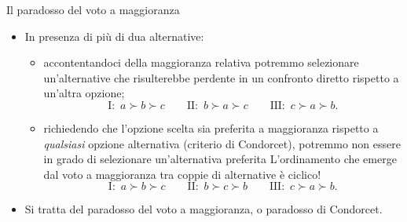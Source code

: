 \documentclass[aspectratio=64,12pt]{beamer}
\begin{document}
\begin{frame}{Il paradosso del voto a maggioranza}
\begin{itemize}
\item In presenza di più di dua alternative:
\begin{itemize}
\item accontentandoci della \alert{maggioranza relativa} potremmo selezionare
un'alternative che risulterebbe perdente in un confronto diretto rispetto
a un'altra opzione;
\begin{equation*}
\text{I:}\enspace a \succ b \succ c \qquad 
\text{II:}\enspace b \succ a \succ c \qquad 
\text{III:}\enspace c \succ a \succ b.
\end{equation*}
\item richiedendo che l'opzione scelta sia preferita a maggioranza rispetto a
\emph{qualsiasi} opzione alternativa (criterio di Condorcet), potremmo non
essere in grado di selezionare un'alternativa preferita
L'ordinamento che emerge dal voto a maggioranza tra coppie di alternative
è \alert{ciclico}!
\begin{equation*}
\text{I:}\enspace a \succ b \succ c \qquad 
\text{II:}\enspace b \succ c \succ b \qquad 
\text{III:}\enspace c \succ a \succ b.
\end{equation*}
\end{itemize}
\item Si tratta del \alert{paradosso del voto a maggioranza}, o \alert{paradosso di Condorcet}.
\end{itemize}
\end{frame}
\end{document}

